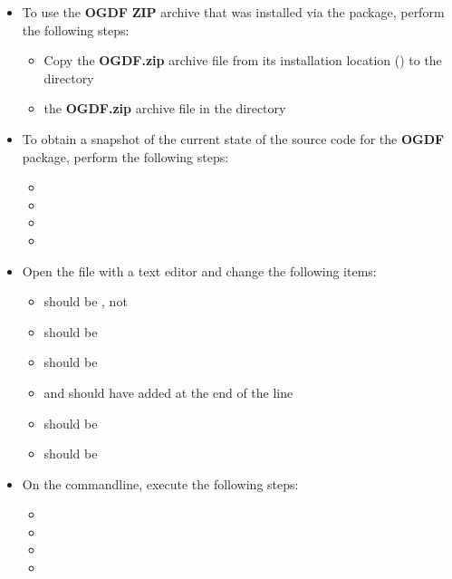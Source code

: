 \begin{itemize}
\item To use the \textbf{OGDF} \textbf{ZIP} archive that was installed via the
 package, perform the following steps:
\begin{itemize}
\item Copy the \textbf{OGDF.zip} archive file from its installation location
() to the directory 
\item\exSp{} the \textbf{OGDF.zip} archive file in the directory
\end{itemize}
\item\exSp{}To obtain a snapshot of the current state of the source code for the
\textbf{OGDF} package, perform the following steps:
\begin{itemize}
\item {}
\item\exSp{}
\item\exSp{}
\item\exSp{}
\end{itemize}
\item\exSp{}Open the file  with a text editor and change the
following items:
\begin{itemize}
\item {} should be , not 
\item\exSp{} should be 
\item\exSp{} should be
\item\exSp{} and  should have  added at the end of the line
\item\exSp{} should be 
\item\exSp{} should be 
\end{itemize}
\item\exSp{}On the command\longDash{}line, execute the following steps:
\begin{itemize}
\item {}
\item\exSp{}
\item\exSp{}
\item\exSp{}
\end{itemize}
\end{itemize}
